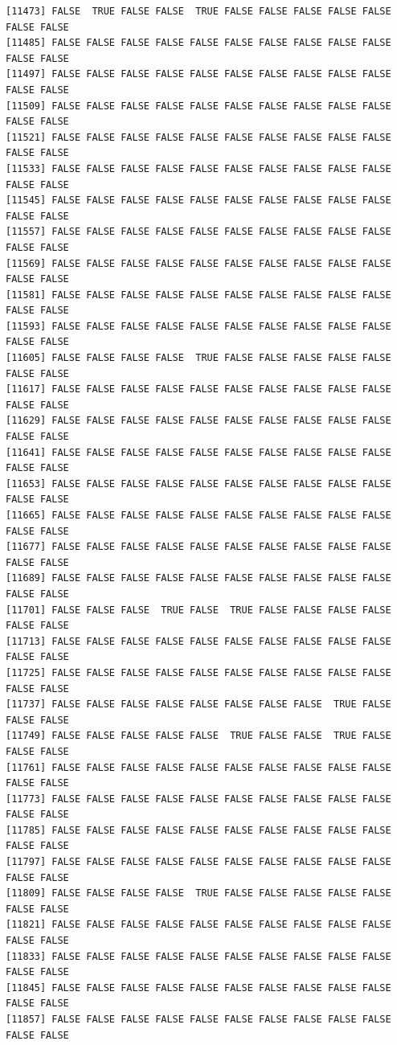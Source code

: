 \documentclass[
  a4paper,
  DIV=11,
  numbers=noendperiod]{scrartcl}
\begin{document}
\begin{verbatim}
[11473] FALSE  TRUE FALSE FALSE  TRUE FALSE FALSE FALSE FALSE FALSE FALSE FALSE
[11485] FALSE FALSE FALSE FALSE FALSE FALSE FALSE FALSE FALSE FALSE FALSE FALSE
[11497] FALSE FALSE FALSE FALSE FALSE FALSE FALSE FALSE FALSE FALSE FALSE FALSE
[11509] FALSE FALSE FALSE FALSE FALSE FALSE FALSE FALSE FALSE FALSE FALSE FALSE
[11521] FALSE FALSE FALSE FALSE FALSE FALSE FALSE FALSE FALSE FALSE FALSE FALSE
[11533] FALSE FALSE FALSE FALSE FALSE FALSE FALSE FALSE FALSE FALSE FALSE FALSE
[11545] FALSE FALSE FALSE FALSE FALSE FALSE FALSE FALSE FALSE FALSE FALSE FALSE
[11557] FALSE FALSE FALSE FALSE FALSE FALSE FALSE FALSE FALSE FALSE FALSE FALSE
[11569] FALSE FALSE FALSE FALSE FALSE FALSE FALSE FALSE FALSE FALSE FALSE FALSE
[11581] FALSE FALSE FALSE FALSE FALSE FALSE FALSE FALSE FALSE FALSE FALSE FALSE
[11593] FALSE FALSE FALSE FALSE FALSE FALSE FALSE FALSE FALSE FALSE FALSE FALSE
[11605] FALSE FALSE FALSE FALSE  TRUE FALSE FALSE FALSE FALSE FALSE FALSE FALSE
[11617] FALSE FALSE FALSE FALSE FALSE FALSE FALSE FALSE FALSE FALSE FALSE FALSE
[11629] FALSE FALSE FALSE FALSE FALSE FALSE FALSE FALSE FALSE FALSE FALSE FALSE
[11641] FALSE FALSE FALSE FALSE FALSE FALSE FALSE FALSE FALSE FALSE FALSE FALSE
[11653] FALSE FALSE FALSE FALSE FALSE FALSE FALSE FALSE FALSE FALSE FALSE FALSE
[11665] FALSE FALSE FALSE FALSE FALSE FALSE FALSE FALSE FALSE FALSE FALSE FALSE
[11677] FALSE FALSE FALSE FALSE FALSE FALSE FALSE FALSE FALSE FALSE FALSE FALSE
[11689] FALSE FALSE FALSE FALSE FALSE FALSE FALSE FALSE FALSE FALSE FALSE FALSE
[11701] FALSE FALSE FALSE  TRUE FALSE  TRUE FALSE FALSE FALSE FALSE FALSE FALSE
[11713] FALSE FALSE FALSE FALSE FALSE FALSE FALSE FALSE FALSE FALSE FALSE FALSE
[11725] FALSE FALSE FALSE FALSE FALSE FALSE FALSE FALSE FALSE FALSE FALSE FALSE
[11737] FALSE FALSE FALSE FALSE FALSE FALSE FALSE FALSE  TRUE FALSE FALSE FALSE
[11749] FALSE FALSE FALSE FALSE FALSE  TRUE FALSE FALSE  TRUE FALSE FALSE FALSE
[11761] FALSE FALSE FALSE FALSE FALSE FALSE FALSE FALSE FALSE FALSE FALSE FALSE
[11773] FALSE FALSE FALSE FALSE FALSE FALSE FALSE FALSE FALSE FALSE FALSE FALSE
[11785] FALSE FALSE FALSE FALSE FALSE FALSE FALSE FALSE FALSE FALSE FALSE FALSE
[11797] FALSE FALSE FALSE FALSE FALSE FALSE FALSE FALSE FALSE FALSE FALSE FALSE
[11809] FALSE FALSE FALSE FALSE  TRUE FALSE FALSE FALSE FALSE FALSE FALSE FALSE
[11821] FALSE FALSE FALSE FALSE FALSE FALSE FALSE FALSE FALSE FALSE FALSE FALSE
[11833] FALSE FALSE FALSE FALSE FALSE FALSE FALSE FALSE FALSE FALSE FALSE FALSE
[11845] FALSE FALSE FALSE FALSE FALSE FALSE FALSE FALSE FALSE FALSE FALSE FALSE
[11857] FALSE FALSE FALSE FALSE FALSE FALSE FALSE FALSE FALSE FALSE FALSE FALSE

\end{verbatim}
\end{document}
